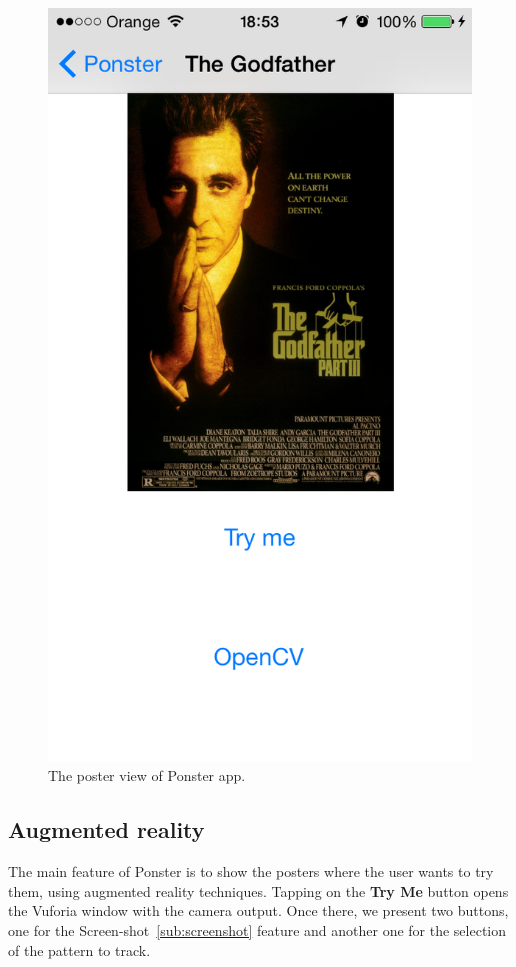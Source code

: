 \begin{figure}
\centering
\includegraphics[scale=0.55]{img/posterview.png}
\caption{\label{fig:posterview} The poster view of Ponster app.}
\end{figure} 

\subsection*{Augmented reality}
The main feature of Ponster is to show the posters where the user wants to try
them, using augmented reality techniques. Tapping on the \textbf{Try Me} button
opens the Vuforia window with the camera output. Once there, we present two
buttons, one for the Screen-shot~\ref{sub:screenshot} feature and another one
for the selection of the pattern to track. 

